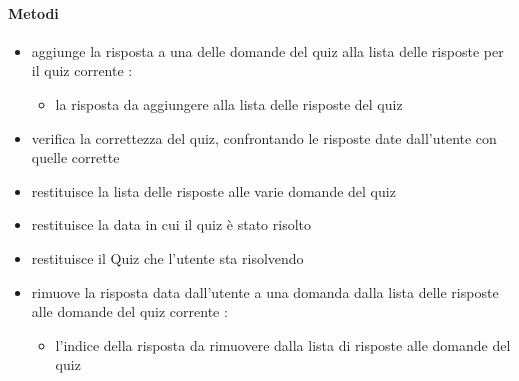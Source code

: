 \paragraph{Metodi}
\begin{itemize}
\item {}
\newline
aggiunge la risposta a una delle domande del quiz alla lista delle risposte per il quiz corrente
\newline
{} :
\begin{itemize}
\item {}
\newline
la risposta da aggiungere alla lista delle risposte del quiz
\end{itemize}
\item {}
\newline
verifica la correttezza del quiz, confrontando le risposte date dall'utente con quelle corrette
\newline
\item {}
\newline
restituisce la lista delle risposte alle varie domande del quiz
\newline
\item {}
\newline
restituisce la data in cui il quiz è stato risolto
\newline
\item {}
\newline
restituisce il Quiz che l'utente sta risolvendo
\newline
\item {}
\newline
rimuove la risposta data dall'utente a una domanda dalla lista delle risposte alle domande del quiz corrente
\newline
{} :
\begin{itemize}
\item {}
\newline
l'indice della risposta da rimuovere dalla lista di risposte alle domande del quiz
\end{itemize}
\end{itemize}
